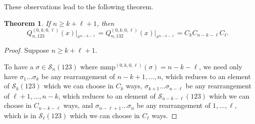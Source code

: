 \documentclass[
final,nomarks
]{dmtcs-episciences}
\newtheorem{theorem}{Theorem}
\newcommand{\Sn}[1]{\mathcal{S}_{#1}}
\newcommand{\Qmmn}[2]{Q_{#2,132}^{(#1)}(x)}
\newcommand{\Qmn}[2]{Q_{#2,123}^{(#1)}(x)}
\newcommand{\mmp}{\mathrm{mmp}}
\begin{document}
These observations lead to the following theorem.
\begin{theorem}\label{theorem:4} If \begin{math}n \geq k + \ell + 1\end{math}, then 
\begin{equation}
\Qmn{0,k,0,\ell}{n}\big\vert_{x^{n-k-\ell}}=\Qmmn{0,k,0,\ell}{n}\big\vert_{x^{n-k-\ell}}=C_k C_{n-k-\ell}C_\ell.
\end{equation}
\end{theorem}
\begin{proof}
	Suppose \begin{math}n \geq k + \ell + 1\end{math}. 
	
	To have a \begin{math}\sigma \in \Sn{n}(123)\end{math} where \begin{math}\mmp^{(0,k,0,\ell)}(\sigma) = n-k-\ell\end{math}, 
	we need only have \begin{math}\sigma_1 \ldots \sigma_k\end{math} be any rearrangement of 
	\begin{math}n-k+1, \ldots, n\end{math}, which reduces to an element of \begin{math}\Sn{k}(123)\end{math} 
	which we can choose in \begin{math}C_k\end{math} ways, \begin{math}\sigma_{k+1} \ldots \sigma_{n-\ell}\end{math} be any rearrangement 
	of \begin{math}\ell+1, \ldots, n-k\end{math}, which reduces to an element of \begin{math}\Sn{n-k-\ell}(123)\end{math} which we can choose 
	in \begin{math}C_{n-k-\ell}\end{math} ways, and \begin{math}\sigma_{n-\ell+1} \ldots \sigma_n\end{math} be any rearrangement of 
	\begin{math}1, \ldots, \ell\end{math}, which is in \begin{math}\Sn{\ell}(123)\end{math} which we can choose in \begin{math}C_\ell\end{math} ways. 
	
\end{proof}
\end{document}

